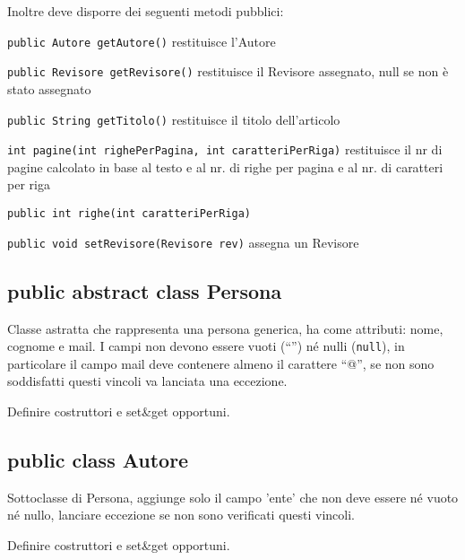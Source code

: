 \documentclass[a4paper]{article}
\begin{document}
Inoltre deve disporre dei seguenti metodi pubblici:

\begin{compactitem} 

\item \texttt{public Autore getAutore()} restituisce l'Autore


\item \texttt{public Revisore 	getRevisore()} restituisce il Revisore 
assegnato, null se non è stato assegnato

\item \texttt{public String getTitolo()} restituisce il titolo dell'articolo

\item \texttt{int 	pagine(int righePerPagina, int caratteriPerRiga)} 
restituisce il nr di pagine calcolato in base al testo e al nr. di righe per 
pagina e al nr. di caratteri per riga

\item \texttt{public int righe(int caratteriPerRiga)}


\item \texttt{public void 	setRevisore(Revisore rev)} assegna un Revisore


\end{compactitem}








\subsection*{public abstract class Persona}

Classe astratta che rappresenta una persona generica, ha come attributi: nome, 
cognome e mail. I campi non devono essere vuoti (``'') né nulli 
(\texttt{null}), in particolare il campo mail deve contenere almeno il 
carattere ``@'', se non sono soddisfatti questi vincoli va lanciata una 
eccezione.

Definire costruttori e set\&get opportuni.


\subsection*{public class Autore}

Sottoclasse di Persona, aggiunge solo il campo 'ente' che non deve essere né 
vuoto né nullo, lanciare eccezione se non sono verificati questi vincoli.

Definire costruttori e set\&get opportuni.
\end{document}
